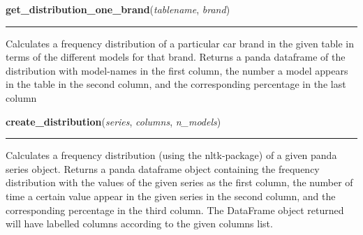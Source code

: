     \label{BilbasenDataMining:datamining:get_distribution_one_brand}

    \vspace{0.5ex}

\hspace{.8\funcindent}\begin{boxedminipage}{\funcwidth}

    \raggedright \textbf{get\_distribution\_one\_brand}(\textit{tablename}, \textit{brand})

    \vspace{-1.5ex}

    \rule{\textwidth}{0.5\fboxrule}
\setlength{\parskip}{2ex}
    Calculates a frequency distribution of a particular car brand in the 
    given table in terms of the different models for that brand. Returns a 
    panda dataframe of the distribution with model-names in the first 
    column, the number a model appears in the table in the second column, 
    and the corresponding percentage in the last column

\setlength{\parskip}{1ex}
    \end{boxedminipage}

    \label{BilbasenDataMining:datamining:create_distribution}

    \vspace{0.5ex}

\hspace{.8\funcindent}\begin{boxedminipage}{\funcwidth}

    \raggedright \textbf{create\_distribution}(\textit{series}, \textit{columns}, \textit{n\_models})

    \vspace{-1.5ex}

    \rule{\textwidth}{0.5\fboxrule}
\setlength{\parskip}{2ex}
    Calculates a frequency distribution (using the nltk-package) of a  
    given panda series object. Returns a panda dataframe object containing 
    the frequency distribution with the values of the given series as the 
    first column, the number of time a certain value appear in the given 
    series in     the second column, and the corresponding percentage in 
    the third column. The DataFrame object returned will have labelled 
    columns according to the given columns list.

\setlength{\parskip}{1ex}
    \end{boxedminipage}

